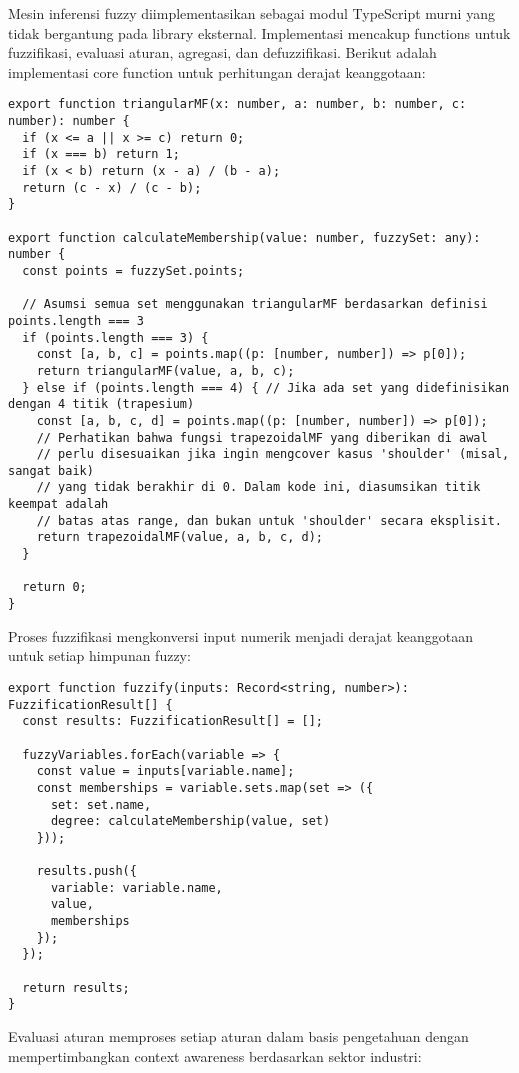\documentclass[12pt,a4paper]{article}
\begin{document}
Mesin inferensi fuzzy diimplementasikan sebagai modul TypeScript murni yang tidak bergantung pada library eksternal. Implementasi mencakup functions untuk fuzzifikasi, evaluasi aturan, agregasi, dan defuzzifikasi. Berikut adalah implementasi core function untuk perhitungan derajat keanggotaan:

\begin{verbatim}
export function triangularMF(x: number, a: number, b: number, c: number): number {
  if (x <= a || x >= c) return 0;
  if (x === b) return 1;
  if (x < b) return (x - a) / (b - a);
  return (c - x) / (c - b);
}

export function calculateMembership(value: number, fuzzySet: any): number {
  const points = fuzzySet.points;
  
  // Asumsi semua set menggunakan triangularMF berdasarkan definisi points.length === 3
  if (points.length === 3) {
    const [a, b, c] = points.map((p: [number, number]) => p[0]);
    return triangularMF(value, a, b, c);
  } else if (points.length === 4) { // Jika ada set yang didefinisikan dengan 4 titik (trapesium)
    const [a, b, c, d] = points.map((p: [number, number]) => p[0]);
    // Perhatikan bahwa fungsi trapezoidalMF yang diberikan di awal
    // perlu disesuaikan jika ingin mengcover kasus 'shoulder' (misal, sangat baik)
    // yang tidak berakhir di 0. Dalam kode ini, diasumsikan titik keempat adalah
    // batas atas range, dan bukan untuk 'shoulder' secara eksplisit.
    return trapezoidalMF(value, a, b, c, d);
  }
  
  return 0;
}
\end{verbatim}

Proses fuzzifikasi mengkonversi input numerik menjadi derajat keanggotaan untuk setiap himpunan fuzzy:

\begin{verbatim}
export function fuzzify(inputs: Record<string, number>): FuzzificationResult[] {
  const results: FuzzificationResult[] = [];
  
  fuzzyVariables.forEach(variable => {
    const value = inputs[variable.name];
    const memberships = variable.sets.map(set => ({
      set: set.name,
      degree: calculateMembership(value, set)
    }));
    
    results.push({
      variable: variable.name,
      value,
      memberships
    });
  });
  
  return results;
}
\end{verbatim}

Evaluasi aturan memproses setiap aturan dalam basis pengetahuan dengan mempertimbangkan context awareness berdasarkan sektor industri:
\end{document}

